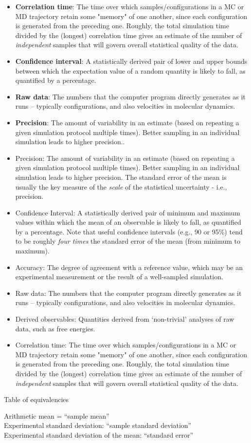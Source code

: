 \begin{itemize}
\item {\bf Correlation time}: The time over which samples/configurations in a MC or MD trajectory retain some "memory" of one another, since each configuration is generated from the preceding one.  Roughly, the total simulation time divided by the (longest) correlation time gives an estimate of the number of \emph{independent} samples that will govern overall statistical quality of the data.

\item {\bf Confidence interval}: A statistically derived pair of lower and upper bounds between which the expectation value of a random quantity is likely to fall, as quantified by a percentage.

\item {\bf Raw data}: The numbers that the computer program directly generates as it runs -- typically configurations, and also velocities in molecular dynamics.

\item {\bf Precision}: The amount of variability in an estimate (based on repeating a given simulation protocol multiple times).
      Better sampling in an individual simulation leads to higher precision..
  
\item Precision: The amount of variability in an estimate (based on repeating a given simulation protocol multiple times).
      Better sampling in an individual simulation leads to higher precision.
      The standard error of the mean is usually the key measure of the \emph{scale} of the statistical uncertainty - i.e., precision.
    \item Confidence Interval: A statistically derived pair of minimum and maximum values within which the mean of an observable is likely to fall, as quantified by a percentage.  Note that useful confidence intervals (e.g., 90 or 95\%) tend to be roughly \emph{four times} the standard error of the mean (from minimum to maximum).
    \item Accuracy: The degree of agreement with a reference value, which may be an experimental measurement or the result of a well-sampled simulation.
    \item Raw data: The numbers that the computer program directly generates as it runs -- typically configurations, and also velocities in molecular dynamics.
    \item Derived observables:  Quantities derived from `non-trivial' analyses of raw data, such as free energies.
    \item Correlation time: The time over which samples/configurations in a MC or MD trajectory retain some "memory" of one another, since each configuration is generated from the preceding one.  Roughly, the total simulation time divided by the (longest) correlation time gives an estimate of the number of \emph{independent} samples that will govern overall statistical quality of the data.

\end{itemize}

Table of equivalencies

Arithmetic mean = ``sample mean''\\
Experimental standard deviation: ``sample standard deviation''\\
Experimental standard deviation of the mean: ``standard error''\\

